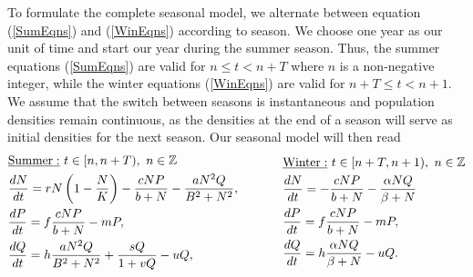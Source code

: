 \documentclass[12pt]{UOthesis}
\theoremstyle{remarkstyle}
\begin{document}
To formulate the complete seasonal model, we alternate between equation (\ref{SumEqns}) and (\ref{WinEqns}) according to season. We choose one year as our unit of time and start our year during the summer season. Thus, the summer equations (\ref{SumEqns}) are valid for $n\le t< n+T$ where $n$ is a non-negative integer, while the winter equations (\ref{WinEqns}) are valid for $n+T\le t< n+1$. We assume that the switch between seasons is instantaneous and population densities remain continuous, as the densities at the end of a season will serve as initial densities for the next season. Our seasonal model will then read
\begin{equation}
\begin{split}
&\underline{\text{Summer}:}\ t\in [n,n+T),\ n\in \mathbb Z\\
&\frac{dN}{dt}=rN\left(1-\frac{N}{K}\right)-\frac{cNP}{b+N}-\frac{aN^2Q}{B^2+N^2},\\
&\frac{dP}{dt}=f\frac{cNP}{b+N}-mP,\\
&\frac{dQ}{dt}=h\frac{aN^2Q}{B^2+N^2}+\frac{sQ}{1+vQ}-uQ,
\end{split}
\hspace{0.5in}
\begin{split}
&\underline{\text{Winter}:}\ t\in [n+T,n+1),\ n\in \mathbb Z\\
&\frac{dN}{dt}=-\frac{cNP}{b+N}-\frac{\alpha NQ}{\beta+N}\\
&\frac{dP}{dt}=f\frac{cNP}{b+N}-mP,\\
&\frac{dQ}{dt}=h\frac{\alpha NQ}{\beta+N}-uQ.
\end{split}
\label{SeasonalModel}
\end{equation}
\end{document}
